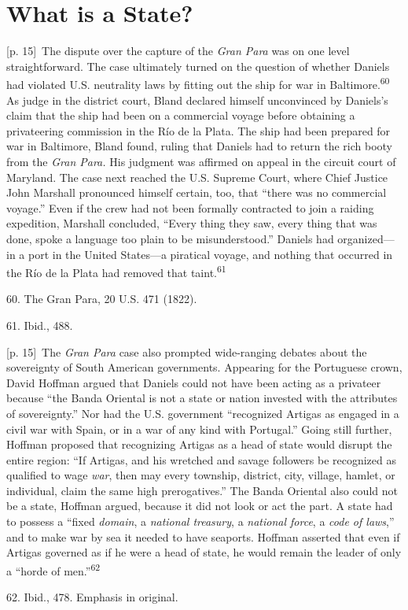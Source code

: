 \documentclass[10pt,a4paper]{article}
\begin{document}
\section*{What is a State?}
{\scriptsize\color{gray} [p. 15]}\ The dispute over the capture of the \textit{Gran Para} was on one level straightforward. The case ultimately turned on the question of whether Daniels had violated U.S. neutrality laws by fitting out the ship for war in Baltimore.\nobreak\textsuperscript{60} As judge in the district court, Bland declared himself unconvinced by Daniels’s claim that the ship had been on a commercial voyage before obtaining a privateering commission in the Río de la Plata. The ship had been prepared for war in Baltimore, Bland found, ruling that Daniels had to return the rich booty from the \textit{Gran Para.} His judgment was affirmed on appeal in the circuit court of Maryland. The case next reached the U.S. Supreme Court, where Chief Justice John Marshall pronounced himself certain, too, that “there was no commercial voyage.” Even if the crew had not been formally contracted to join a raiding expedition, Marshall concluded, “Every thing they saw, every thing that was done, spoke a language too plain to be misunderstood.” Daniels had organized—in a port in the United States—a piratical voyage, and nothing that occurred in the Río de la Plata had removed that taint.\nobreak\textsuperscript{61}\par{\small 60. The Gran Para, 20 U.S. 471 (1822).\par}{\small 61. Ibid., 488.\par}
{\scriptsize\color{gray} [p. 15]}\ The \textit{Gran Para} case also prompted wide-ranging debates about the sovereignty of South American governments. Appearing for the Portuguese crown, David Hoffman argued that Daniels could not have been acting as a privateer because “the Banda Oriental is not a state or nation invested with the attributes of sovereignty.” Nor had the U.S. government “recognized Artigas as engaged in a civil war with Spain, or in a war of any kind with Portugal.” Going still further, Hoffman proposed that recognizing Artigas as a head of state would disrupt the entire region: “If Artigas, and his wretched and savage followers be recognized as qualified to wage \textit{war}, then may every township, district, city, village, hamlet, or individual, claim the same high prerogatives.” The Banda Oriental also could not be a state, Hoffman argued, because it did not look or act the part. A state had to possess a “fixed \textit{domain}, a \textit{national treasury}, a \textit{national force}, a \textit{code of laws},” and to make war by sea it needed to have seaports. Hoffman asserted that even if Artigas governed as if he were a head of state, he would remain the leader of only a “horde of men.”\nobreak\textsuperscript{62}\par{\small 62. Ibid., 478. Emphasis in original.\par}
\end{document}
